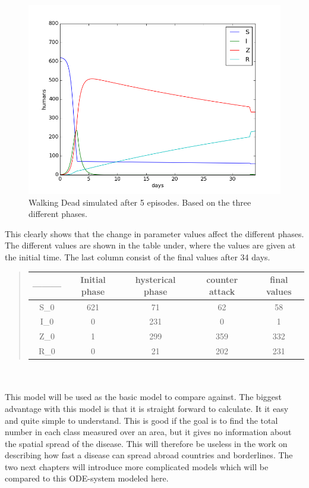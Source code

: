 \documentclass[%
twoside,                 %
final,                   %
10pt]{article}
\begin{document}
\begin{figure}[ht]
  \centerline{\includegraphics[width=0.9\linewidth]{plots/WD_zombie_all_phases_1.png}}
  \caption{
  Walking Dead simulated after 5 episodes. Based on the three different phases.
  }
\end{figure}


This clearly shows that the change in parameter values affect the different phases. The different values are shown in the table under, where the values are given at the initial time. The last column consist of the final values after 34 days.

\begin{quote}
\begin{tabular}{ccccc}
\hline
\multicolumn{1}{c}{ --------- } & \multicolumn{1}{c}{ Initial phase } & \multicolumn{1}{c}{ hysterical phase } & \multicolumn{1}{c}{ counter attack } & \multicolumn{1}{c}{ final values } \\
\hline
S_0              & 621              & 71               & 62               & 58               \\
I_0              & 0                & 231              & 0                & 1                \\
Z_0              & 1                & 299              & 359              & 332              \\
R_0              & 0                & 21               & 202              & 231              \\
\hline
\end{tabular}
\end{quote}

\noindent
\\
\\
This model will be used as the basic model to compare against. The biggest advantage with this model is that it is straight forward to calculate. It it easy and quite simple to understand. This is good if the goal is to find the total number in each class measured over an area, but it gives no information about the spatial spread of the disease. This will therefore be useless in the work on describing how fast a disease can spread abroad countries and borderlines. The two next chapters will introduce more complicated models which will be compared to this ODE-system modeled here.








\printindex
\end{document}
